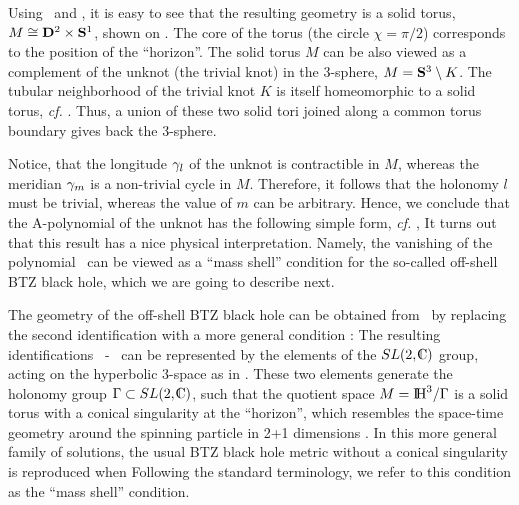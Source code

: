 Using \xyzvia\ and \btzident, it is easy to see that the resulting
geometry is a solid torus, $M \cong {\bf D}^2 \times \S^1$,
shown on \euclbtzfig.
The core of the torus (the circle $\chi=\pi/2$) corresponds to
the position of the ``horizon''.
The solid torus $M$ can be also viewed as a complement of the unknot
(the trivial knot) in the 3-sphere, $M = \S^3 \setminus K$.
The tubular neighborhood of the trivial knot $K$
is itself homeomorphic to a solid torus, {\it cf.} \lmcycles.
Thus, a union of these two solid tori joined along a common
torus boundary gives back the 3-sphere.

Notice, that the longitude $\g_l$ of the unknot is contractible in $M$,
whereas the meridian $\g_m$ is a non-trivial cycle in $M$.
Therefore, it follows that the holonomy $l$ must be trivial,
whereas the value of $m$ can be arbitrary.
Hence, we conclude that the A-polynomial of the unknot
has the following simple form, {\it cf.} \aunknot,
%
\eqn{}
%
It turns out that this result has a nice physical interpretation.
Namely, the vanishing of the polynomial \lminusone\ can be
viewed as a ``mass shell'' condition for the so-called
off-shell BTZ black hole, which we are going to describe next.

The geometry of the off-shell BTZ black hole can be
obtained from \btzident\ by replacing the second
identification with a more general
condition :
%
\eqn{}
%
The resulting identifications \btzident\ - \btzprimeident\
can be represented by the elements of the $SL(2,\IC)$ group,
%
\eqn{}
%
acting on the hyperbolic 3-space as in \gammaonh.
These two elements generate the holonomy group
$\Gamma \subset SL(2,\IC)$, such that the quotient space
$M=\IH^3 / \Gamma$ is a solid torus with a conical singularity
at the ``horizon'', which resembles the space-time geometry
around the spinning particle in 2+1 dimensions \DJT.
In this more general family of solutions, the usual
BTZ black hole metric without a conical singularity
is reproduced when
%
\eqn\btzonshell{\Si=0 \quad , \quad \Theta=2\pi}
%
Following the standard terminology,
we refer to this condition as the ``mass shell'' condition.

